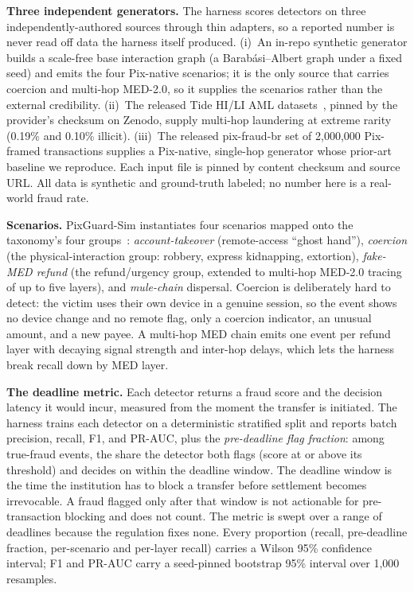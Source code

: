 \documentclass[12pt]{article}
\newcommand{\sysname}{PixGuard-Sim\xspace}
\newcommand{\TideHiRate}{0.19\%}
\newcommand{\TideLiRate}{0.10\%}
\begin{document}
\noindent\textbf{Three independent generators.} The harness scores detectors on
three independently-authored sources through thin adapters, so a reported number
is never read off data the harness itself produced. (i)~An in-repo synthetic
generator builds a scale-free base interaction graph (a Barab\'asi--Albert graph
under a fixed seed) and emits the four Pix-native scenarios; it is the only
source that carries coercion and multi-hop MED-2.0, so it supplies the scenarios
rather than the external credibility. (ii)~The released Tide HI/LI AML
datasets~\cite{vandenbeukel2026tide}, pinned by the provider's checksum on
Zenodo, supply multi-hop laundering at extreme rarity (\TideHiRate{} and
\TideLiRate{} illicit). (iii)~The released pix-fraud-br set of 2{,}000{,}000
Pix-framed transactions supplies a Pix-native, single-hop generator whose
prior-art baseline we reproduce. Each input file is pinned by content checksum
and source URL. All data is synthetic and ground-truth labeled; no number here is
a real-world fraud rate.

\noindent\textbf{Scenarios.} \sysname{} instantiates four scenarios mapped onto
the taxonomy's four groups~\cite{pizzolato2025taxonomy}: \emph{account-takeover}
(remote-access ``ghost hand''), \emph{coercion} (the physical-interaction group:
robbery, express kidnapping, extortion), \emph{fake-MED refund} (the
refund/urgency group, extended to multi-hop MED-2.0 tracing of up to five
layers), and \emph{mule-chain} dispersal. Coercion is deliberately hard to
detect: the victim uses their own device in a genuine session, so the event
shows no device change and no remote flag, only a coercion indicator, an unusual
amount, and a new payee. A multi-hop MED chain emits one event per refund layer
with decaying signal strength and inter-hop delays, which lets the harness break
recall down by MED layer.

\noindent\textbf{The deadline metric.} Each detector returns a fraud score and
the decision latency it would incur, measured from the moment the transfer is
initiated. The harness trains each detector on a deterministic stratified split
and reports batch precision, recall, F1, and PR-AUC, plus the
\emph{pre-deadline flag fraction}: among true-fraud events, the share the
detector both flags (score at or above its threshold) and decides on within the
deadline window. The deadline window is the time the institution has to block a
transfer before settlement becomes irrevocable. A fraud flagged only after that
window is not actionable for pre-transaction blocking and does not count. The
metric is swept over a range of deadlines because the regulation fixes none.
Every proportion (recall, pre-deadline fraction, per-scenario and per-layer
recall) carries a Wilson 95\% confidence interval; F1 and PR-AUC carry a
seed-pinned bootstrap 95\% interval over 1{,}000 resamples.
\end{document}
